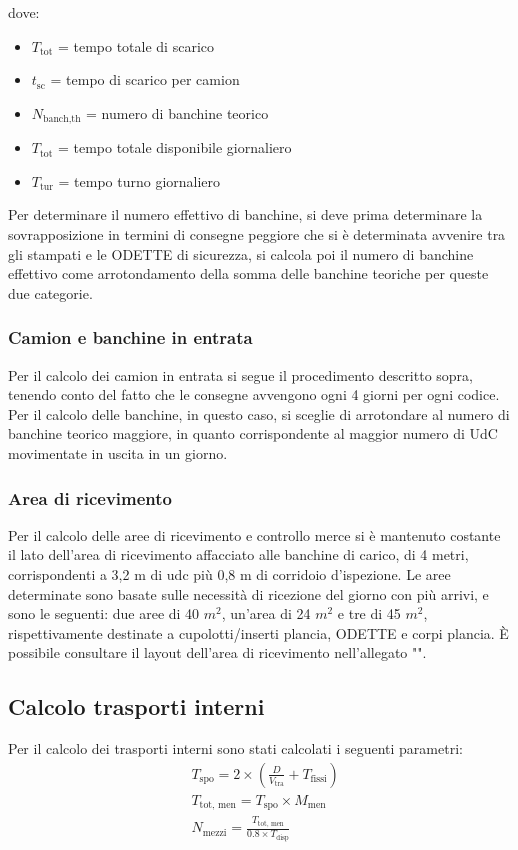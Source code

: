 \documentclass[11pt]{article}
\begin{document}
\noindent
dove:
\begin{itemize}
    \item $T_\text{tot}$ = tempo totale di scarico
    \item $t_\text{sc}$ = tempo di scarico per camion
    \item $N_\text{banch,th}$ = numero di banchine teorico
    \item $T_\text{tot}$ = tempo totale disponibile giornaliero
    \item $T_\text{tur}$ = tempo turno giornaliero
\end{itemize}

Per determinare il numero effettivo di banchine, si deve prima determinare la sovrapposizione in termini di consegne peggiore che si è determinata avvenire tra gli stampati e le ODETTE di sicurezza, si calcola poi il numero di banchine effettivo come arrotondamento della somma delle banchine teoriche per queste due categorie.
\subsubsection{Camion e banchine in entrata}
Per il calcolo dei camion in entrata si segue il procedimento descritto sopra, tenendo conto del fatto che le consegne avvengono ogni 4 giorni per ogni codice.
Per il calcolo delle banchine, in questo caso, si sceglie di arrotondare al numero di banchine teorico maggiore, in quanto corrispondente al maggior numero di UdC movimentate in uscita in un giorno.
\subsubsection{Area di ricevimento}
Per il calcolo delle aree di ricevimento e controllo merce si è mantenuto costante il lato dell'area di ricevimento affacciato alle banchine di carico, di 4 metri, corrispondenti a 3,2 m di udc più 0,8 m di corridoio d'ispezione.
Le aree determinate sono basate sulle necessità di ricezione del giorno con più arrivi, e sono le seguenti: due aree di 40 $m^2$, un'area di 24 $m^2$ e tre di 45 $m^2$, rispettivamente destinate a cupolotti/inserti plancia, ODETTE e corpi plancia.
È possibile consultare il layout dell'area di ricevimento nell'allegato "".
\newpage

\subsection{Calcolo trasporti interni}
Per il calcolo dei trasporti interni sono stati calcolati i seguenti parametri:
\begin{align}
    & T_\text{spo} = 2 \times \left( \frac{D}{V_\text{tra}} + T_\text{fissi} \right) \\
    & T_\text{tot, men} = T_\text{spo} \times M_\text{men} \\
    & N_\text{mezzi} = \frac{T_\text{tot, men}}{0.8 \times T_\text{disp}}
\end{align}
\end{document}

